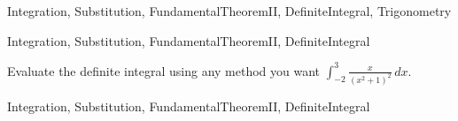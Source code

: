 \begin{tagblock}{Integration, Substitution, FundamentalTheoremII, DefiniteIntegral, Trigonometry}
\begin{question}
\begin{diary}
	   
\end{diary}
	
\begin{solution}
	   
	    \end{enumerate}
\end{solution}
	
\end{question}

\end{tagblock}

\begin{tagblock}{Integration, Substitution, FundamentalTheoremII, DefiniteIntegral}
\begin{question}

Evaluate the definite integral using any method you want $\displaystyle \int_{-2}^3 \frac{x}{(x^2+1)^2} \, dx$.



	
	
\begin{tags}
	  Integration, Substitution, FundamentalTheoremII, DefiniteIntegral
\end{tags}
	
\begin{diary}
	   
\end{diary}
	
\begin{solution}
	   
	    \end{enumerate}
\end{solution}
	
\end{question}

\end{tagblock}

